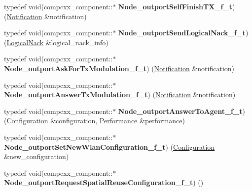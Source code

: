 \begin{DoxyCompactItemize}
\item 
\mbox{\label{classcompcxx__component_a862b0c9aa0a29f8db0e7fa5c9d30f627}} 
typedef void(compcxx\+\_\+component\+::$\ast$ {\bfseries Node\+\_\+outport\+Self\+Finish\+T\+X\+\_\+f\+\_\+t}) (\hyperlink{structNotification}{Notification} \&notification)
\item 
\mbox{\label{classcompcxx__component_a089908d5367f9c1ae42739e55cf3b25a}} 
typedef void(compcxx\+\_\+component\+::$\ast$ {\bfseries Node\+\_\+outport\+Send\+Logical\+Nack\+\_\+f\+\_\+t}) (\hyperlink{structLogicalNack}{Logical\+Nack} \&logical\+\_\+nack\+\_\+info)
\item 
\mbox{\label{classcompcxx__component_aadb97834bcb0f5bc3b8cd79713f62944}} 
typedef void(compcxx\+\_\+component\+::$\ast$ {\bfseries Node\+\_\+outport\+Ask\+For\+Tx\+Modulation\+\_\+f\+\_\+t}) (\hyperlink{structNotification}{Notification} \&notification)
\item 
\mbox{\label{classcompcxx__component_af69a02618a8d2f8f6c1c9792a92c459f}} 
typedef void(compcxx\+\_\+component\+::$\ast$ {\bfseries Node\+\_\+outport\+Answer\+Tx\+Modulation\+\_\+f\+\_\+t}) (\hyperlink{structNotification}{Notification} \&notification)
\item 
\mbox{\label{classcompcxx__component_a0eb11913f26856b9ceb28385f299fa7e}} 
typedef void(compcxx\+\_\+component\+::$\ast$ {\bfseries Node\+\_\+outport\+Answer\+To\+Agent\+\_\+f\+\_\+t}) (\hyperlink{structConfiguration}{Configuration} \&configuration, \hyperlink{structPerformance}{Performance} \&performance)
\item 
\mbox{\label{classcompcxx__component_a0e928bd77e9c27615ff88f8b49f7b68b}} 
typedef void(compcxx\+\_\+component\+::$\ast$ {\bfseries Node\+\_\+outport\+Set\+New\+Wlan\+Configuration\+\_\+f\+\_\+t}) (\hyperlink{structConfiguration}{Configuration} \&new\+\_\+configuration)
\item 
\mbox{\label{classcompcxx__component_a1adf2972a45d9b9e3bc296cde6bebe98}} 
typedef void(compcxx\+\_\+component\+::$\ast$ {\bfseries Node\+\_\+outport\+Request\+Spatial\+Reuse\+Configuration\+\_\+f\+\_\+t}) ()

\end{DoxyCompactItemize}
